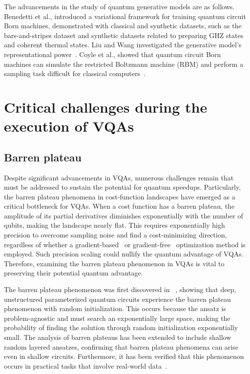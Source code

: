 \documentclass[12pt,dvipdfmx,twoside,openright]{report}
\begin{document}
The advancements in the study of quantum generative models are as follows.
Benedetti et al., introduced a variational framework for training quantum circuit Born machines, demonstrated with classical and synthetic datasets, such as the bars-and-stripes dataset and synthetic datasets related to preparing GHZ states and coherent thermal states\cite{born-machine}.
Liu and Wang investigated the generative model's representational power~\cite{q-generative2}.
Coyle et al., showed that quantum circuit Born machines can simulate the restricted Boltzmann machine (RBM) and perform a sampling task difficult for classical computers~\cite{q-generative3}.


\section{Critical challenges during the execution of VQAs}



\subsection{Barren plateau}
Despite significant advancements in VQAs, numerous challenges remain that must be addressed to sustain the potential for quantum speedups.
Particularly, the barren plateau phenomena in cost-function landscapes have emerged as a critical bottleneck for VQAs.
When a cost function has a barren plateau, the amplitude of its partial derivatives diminishes exponentially with the number of qubits, making the landscape nearly flat.
This requires exponentially high precision to overcome sampling noise and find a cost-minimizing direction, regardless of whether a gradient-based~\cite{gradient-based} or gradient-free~\cite{gradient-free} optimization method is employed.
Such precision scaling could nullify the quantum advantage of VQAs.
Therefore, examining the barren plateau phenomenon in VQAs is vital to preserving their potential quantum advantage.

The barren plateau phenomenon was first discovered in ~\cite{barrenplateau1}, showing that deep, unstructured parameterized quantum circuits experience the barren plateau phenomenon with random initialization.
This occurs because the ansatz is problem-agnostic and must search an exponentially large space, making the probability of finding the solution through random initialization exponentially small.
The analysis of barren plateaus has been extended to include shallow random layered ansatzes, confirming that barren plateau phenomena can arise even in shallow circuits.
Furthermore, it has been verified that this phenomenon occurs in practical tasks that involve real-world data~\cite{barren-generic0,barren-generic1,barren-generic2}.
\end{document}
